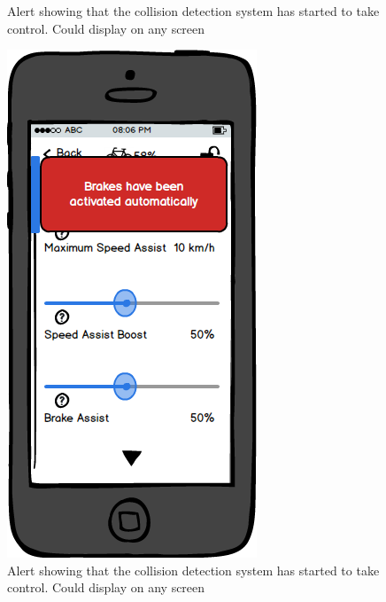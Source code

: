 \documentclass[a4paper]{report}
\begin{document}
{\begin{figure}
\caption{Alert showing that the collision detection system has started to take control. Could display on any screen}
\end{figure}
\clearpage
\begin{figure}
\centering
\includegraphics[scale=0.8]{figures/prototype_2/settings_control_alert}
\caption{Alert showing that the collision detection system has started to take control. Could display on any screen}
\end{figure}
\clearpage
\begin{figure}
\centering

\end{figure}}
\end{document}

